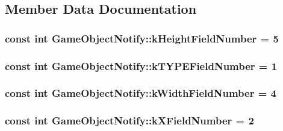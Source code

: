 \subsection{Member Data Documentation}
\hypertarget{class_game_object_notify_a15142be03ab21831b8f54cd346a409a2}{
\subsubsection[{k\-Height\-Field\-Number}]{\setlength{\rightskip}{0pt plus 5cm}const int Game\-Object\-Notify\-::k\-Height\-Field\-Number = 5\hspace{0.3cm}{\ttfamily [static]}}}\label{class_game_object_notify_a15142be03ab21831b8f54cd346a409a2}
\hypertarget{class_game_object_notify_a1686fae6e717999f7a4a3c883336ae5d}{
\subsubsection[{k\-T\-Y\-P\-E\-Field\-Number}]{\setlength{\rightskip}{0pt plus 5cm}const int Game\-Object\-Notify\-::k\-T\-Y\-P\-E\-Field\-Number = 1\hspace{0.3cm}{\ttfamily [static]}}}\label{class_game_object_notify_a1686fae6e717999f7a4a3c883336ae5d}
\hypertarget{class_game_object_notify_a5462ed3aee65d02ae60fe9a2de05a849}{
\subsubsection[{k\-Width\-Field\-Number}]{\setlength{\rightskip}{0pt plus 5cm}const int Game\-Object\-Notify\-::k\-Width\-Field\-Number = 4\hspace{0.3cm}{\ttfamily [static]}}}\label{class_game_object_notify_a5462ed3aee65d02ae60fe9a2de05a849}
\hypertarget{class_game_object_notify_a433cdc06e51abce278f247ff3a046608}{
\subsubsection[{k\-X\-Field\-Number}]{\setlength{\rightskip}{0pt plus 5cm}const int Game\-Object\-Notify\-::k\-X\-Field\-Number = 2\hspace{0.3cm}{\ttfamily [static]}}}\label{class_game_object_notify_a433cdc06e51abce278f247ff3a046608}
